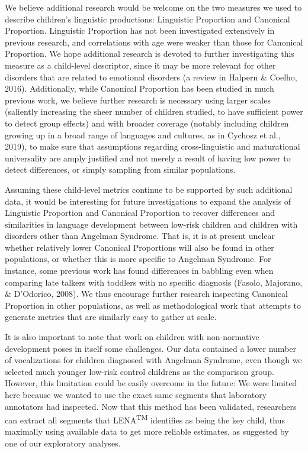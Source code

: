 \documentclass[english,,man,floatsintext]{apa6}
\begin{document}
We believe additional research would be welcome on the two measures we used to describe children's linguistic productions: Linguistic Proportion and Canonical Proportion. Linguistic Proportion has not been investigated extensively in previous research, and correlations with age were weaker than those for Canonical Proportion. We hope additional research is devoted to further investigating this measure as a child-level descriptor, since it may be more relevant for other disorders that are related to emotional disorders (a review in Halpern \& Coelho, 2016). Additionally, while Canonical Proportion has been studied in much previous work, we believe further research is necessary using larger scales (saliently increasing the sheer number of children studied, to have sufficient power to detect group effects) and with broader coverage (notably including children growing up in a broad range of languages and cultures, as in Cychosz et al., 2019), to make sure that assumptions regarding cross-linguistic and maturational universality are amply justified and not merely a result of having low power to detect differences, or simply sampling from similar populations.

Assuming these child-level metrics continue to be supported by such additional data, it would be interesting for future investigations to expand the analysis of Linguistic Proportion and Canonical Proportion to recover differences and similarities in language development between low-risk children and children with disorders other than Angelman Syndrome. That is, it is at present unclear whether relatively lower Canonical Proportions will also be found in other populations, or whether this is more specific to Angelman Syndrome. For instance, some previous work has found differences in babbling even when comparing late talkers with toddlers with no specific diagnosis (Fasolo, Majorano, \& D'Odorico, 2008). We thus encourage further research inspecting Canonical Proportion in other populations, as well as methodological work that attempts to generate metrics that are similarly easy to gather at scale.

It is also important to note that work on children with non-normative development poses in itself some challenges. Our data contained a lower number of vocalizations for children diagnosed with Angelman Syndrome, even though we selected much younger low-risk control childrens as the comparison group. However, this limitation could be easily overcome in the future: We were limited here because we wanted to use the exact same segments that laboratory annotators had inspected. Now that this method has been validated, researchers can extract all segments that LENA\textsuperscript{TM} identifies as being the key child, thus maximally using available data to get more reliable estimates, as suggested by one of our exploratory analyses.
\end{document}
